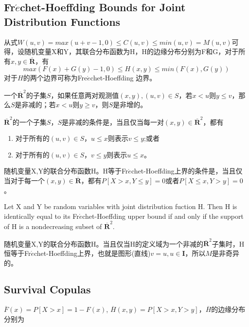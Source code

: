\subsection{Fr$\acute{e}$chet-Hoeffding Bounds for Joint Distribution Functions}
从式$W(u,v)=max(u+v-1,0)\leq C(u,v) \leq min(u,v)=M(u,v)$可得，设随机变量X和Y，其联合分布函数为H，H的边缘分布分别为F和G，对于所有$x,y \in \overline{\mathbf{R}}$，有
\begin{equation}
    max(F(x)+G(y)-1,0) \leq H(x,y) \leq min(F(x),G(y))
    \label{eq2.5.1}
\end{equation}
对于$H$的两个边界可称为Fre$\acute{e}$chet-Hoeffding 边界。
\begin{definition}
    一个$\overline{\mathbf{R}}^2$的子集$S$，如果任意两对观测值$(x,y),(u,v) \in S$，若$x<u$则$y\leq v$，那么$S$是非减的；若$x<u$则$y\geq v$，则$S$是非增的。
    \label{def-fh}
\end{definition}
\begin{lemma}
    $\overline{\mathbf{R}}^2$的一个子集$S$，$S$是非减的条件是，当且仅当每一对$(x,y) \in \overline{\mathbf{R}}^2$，都有
    \begin{enumerate}
        \item 对于所有的$(u,v) \in S$，$u\leq x$则表示$v\leq y$;或者
        \item 对于所有的$(u,v) \in S$，$v\leq y$则表示$u\leq x$。
    \end{enumerate}
    \label{lemma-fh1}
\end{lemma}
\begin{lemma}
    随机变量X,Y的联合分布函数H。H等于Fr$\acute{e}$chet-Hoeffding上界的条件是，当且仅当对于每一个$(x,y)\in\overline{\mathbf{R}}$，都有$P[X>x,Y\leq y] = 0$或者$P[X\leq x,Y>y]=0$。
    \label{lemma-fh2}
\end{lemma}
\begin{theorem}
    Let X and Y be random variables with joint distribution fuction H. Then H is identically equal to its Fr$\acute{e}$chet-Hoeffding upper bound if and only if the support of H is a nondecreasing subset of $\overline{\mathbf{R}}^2$.
    
    随机变量X,Y的联合分布函数H。当且仅当H的定义域为一个非减的$\overline{\mathbf{R}}^2$子集时，H恒等于Fr$\acute{e}$chet-Hoeffding上界，也就是图形(直线)$v=u, u\in\mathbf{I}$，所以$M$是非奇异的。
    \label{thr-fhupper}
\end{theorem}



\subsection{Survival Copulas}
$\overline{F}(x) = P[X>x] = 1- F(x)$, $\overline{H}(x,y) = P[X>x,Y>y]$，$\overline{H}$的边缘分布分别为

